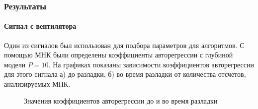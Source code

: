 \documentclass[9pt]{beamer}
\begin{document}
\begin{frame}\frametitle{Результаты}
\framesubtitle{Сигнал с вентилятора}
Один из сигналов был использован для подбора параметров для алгоритмов. С помощью МНК были определены коэффициенты авторегрессии с глубиной модели $P = 10$. На графиках показаны зависимости коэффициентов авторегрессии для этого сигнала а) до разладки, б) во время разладки от количества отсчетов, анализируемых МНК. 
\begin{figure}[h]
\begin{minipage}[h]{0.49\linewidth}
\end{minipage}
\begin{minipage}[h]{0.49\linewidth}
\end{minipage}
\caption{Значения коэффициентов авторегрессии до и во время разладки}
\end{figure}
\end{frame}
\end{document}
